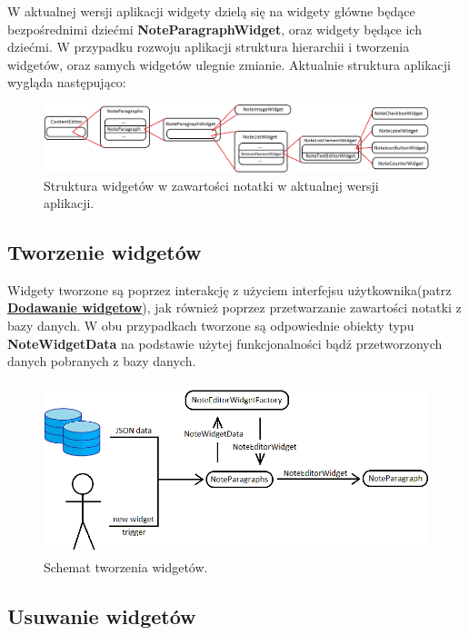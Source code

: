 W aktualnej wersji aplikacji widgety dzielą się na widgety główne będące bezpośrednimi dziećmi \textbf{NoteParagraphWidget}, oraz widgety będące ich dziećmi. W przypadku rozwoju aplikacji struktura hierarchii i tworzenia widgetów, oraz samych widgetów ulegnie zmianie. Aktualnie struktura aplikacji wygląda następująco:

\begin{figure}[ht]
    \centering
    \includegraphics[width=\linewidth]{images/struktura_widgetow_w_notatce.png}
    \caption{Struktura widgetów w zawartości notatki w aktualnej wersji aplikacji.}
    \label{fig:struktura-widgetow}
\end{figure}

\subsection{Tworzenie widgetów}

Widgety tworzone są poprzez interakcję z użyciem interfejsu użytkownika(patrz \hyperref[sub:dodawanieWidgetow]{\textbf{Dodawanie widgetow}}), jak również poprzez przetwarzanie zawartości notatki z bazy danych. W obu przypadkach tworzone są odpowiednie obiekty typu \textbf{NoteWidgetData} na podstawie użytej funkcjonalności bądź przetworzonych danych pobranych z bazy danych.

\begin{figure}[ht]
    \centering
    \includegraphics[height=5cm]{images/tworzenie_widgetow.png}
    \caption{Schemat tworzenia widgetów.}
    \label{fig:create-widget}
\end{figure}

\subsection{Usuwanie widgetów}

